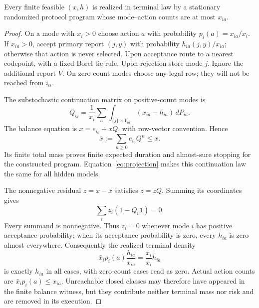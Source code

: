 \begin{lemma}\label{lem:realization}
Every finite feasible $(x,h)$ is realized in terminal law by a stationary randomized protocol program whose mode--action counts are at most $x_{ia}$.
\end{lemma}
\begin{proof}
On a mode with $x_i>0$ choose action $a$ with probability $p_i(a)=x_{ia}/x_i$. If $x_{ia}>0$, accept primary report $(j,y)$ with probability $h_{ia}(j,y)/x_{ia}$; otherwise that action is never selected. Upon acceptance route to a nearest codepoint, with a fixed Borel tie rule. Upon rejection store mode $j$. Ignore the additional report $V$. On zero-count modes choose any legal row; they will not be reached from $i_0$.

The substochastic continuation matrix on positive-count modes is
\begin{equation}\label{eq:Q}
 Q_{ij}=\frac1{x_i}\sum_a\int_{\{j\}\times Y_{ia}}(x_{ia}-h_{ia})\,dP_{ia}.
\end{equation}
The balance equation is $x=e_{i_0}+xQ$, with row-vector convention. Hence
\[
 \bar x:=\sum_{n\ge0}e_{i_0}Q^n\le x.
\]
Its finite total mass proves finite expected duration and almost-sure stopping for the constructed program. Equation~\eqref{eq:projection} makes this continuation law the same for all hidden models.

The nonnegative residual $z=x-\bar x$ satisfies $z=zQ$. Summing its coordinates gives
\[
 \sum_i z_i(1-Q_i\mathbf1)=0.
\]
Every summand is nonnegative. Thus $z_i=0$ whenever mode $i$ has positive acceptance probability; when its acceptance probability is zero, every $h_{ia}$ is zero almost everywhere. Consequently the realized terminal density
\[
 \bar x_i p_i(a)\frac{h_{ia}}{x_{ia}}
       =\frac{\bar x_i}{x_i}h_{ia}
\]
is exactly $h_{ia}$ in all cases, with zero-count cases read as zero. Actual action counts are $\bar x_i p_i(a)\le x_{ia}$. Unreachable closed classes may therefore have appeared in the finite balance witness, but they contribute neither terminal mass nor risk and are removed in its execution.
\end{proof}

